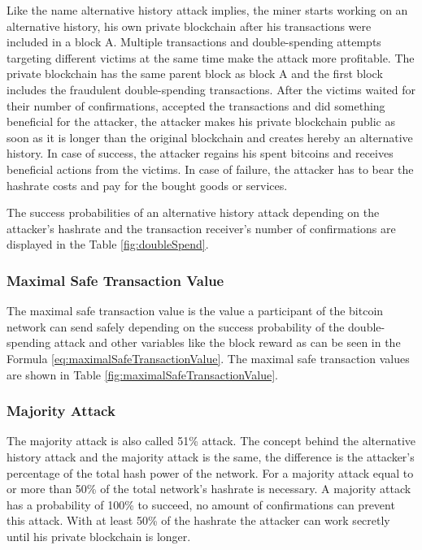 Like the name alternative history attack implies, the miner starts working on an alternative history, his own private blockchain after his transactions were included in a block A. Multiple transactions and double-spending attempts targeting different victims at the same time make the attack more profitable. The private blockchain has the same parent block as block A and the first block includes the fraudulent double-spending transactions. After the victims waited for their number of confirmations, accepted the transactions and did something beneficial for the attacker, the attacker makes his private blockchain public as soon as it is longer than the original blockchain and creates hereby an alternative history.
In case of success, the attacker regains his spent bitcoins and receives beneficial actions from the victims.
In case of failure, the attacker has to bear the hashrate costs and pay for the bought goods or services.

The success probabilities of an alternative history attack depending on the attacker's hashrate and the transaction receiver's number of confirmations are displayed in the Table \ref{fig:doubleSpend}.

\subsubsection{Maximal Safe Transaction Value}
The maximal safe transaction value is the value a participant of the bitcoin network can send safely depending on the success probability of the double-spending attack and other variables like the block reward as can be seen in the Formula \eqref{eq:maximalSafeTransactionValue}. The maximal safe transaction values are shown in Table \ref{fig:maximalSafeTransactionValue}.

\subsubsection{Majority Attack\label{subsubsection:majorityAttack}}
The majority attack is also called 51\% attack. The concept behind the alternative history attack and the majority attack is the same, the difference is the attacker's percentage of the total hash power of the network. For a majority attack equal to or more than 50\% of the total network's hashrate is necessary. A majority attack has a probability of 100\% to succeed, no amount of confirmations can prevent this attack. With at least 50\% of the hashrate the attacker can work secretly until his private blockchain is longer.

